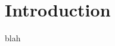 \AddToShipoutPicture*{\TowerGardenII}
\chapter{Introduction}



\newpage
\AddToShipoutPicture*{\TowerGardenIII}
blah